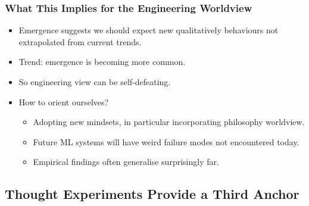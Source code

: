 \subsubsection{What This Implies for the Engineering Worldview}

\begin{itemize}
    \item Emergence suggests we should expect new qualitatively behaviours not extrapolated from current trends.
    \item Trend: emergence is becoming more common. 
    \item So engineering view can be self-defeating.
    \item How to orient ourselves?
    \begin{itemize}
        \item Adopting new mindsets, in particular incorporating philosophy worldview.
        \item Future ML systems will have weird failure modes not encountered today.
        \item Empirical findings often generalise surprisingly far.
    \end{itemize}
\end{itemize}


\subsection{Thought Experiments Provide a Third Anchor}